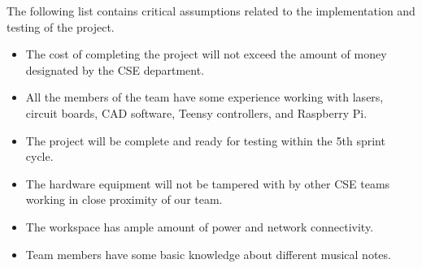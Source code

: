 The following list contains critical assumptions related to the implementation and testing of the project.

\begin{itemize}
  \item The cost of completing the project will not exceed the amount of money designated by the CSE department.
  \item All the members of the team have some experience working with lasers, circuit boards, CAD software, Teensy controllers, and Raspberry Pi.
  \item The project will be complete and ready for testing within the 5th sprint cycle.
  \item The hardware equipment will not be tampered with by other CSE teams working in close proximity of our team.
  \item The workspace has ample amount of power and network connectivity.
  \item Team members have some basic knowledge about different musical notes.
\end{itemize}
